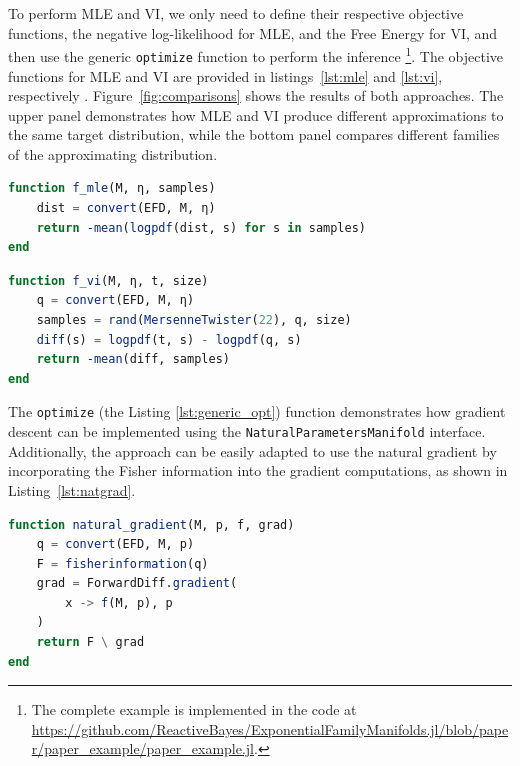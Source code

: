 \documentclass{juliacon}
\begin{document}
To perform MLE and VI, we only need to define their respective objective functions, the negative log-likelihood for MLE, and the Free Energy for VI, and then use the generic \texttt{optimize} function to perform the inference \footnote{The complete example is implemented in the code at \url{https://github.com/ReactiveBayes/ExponentialFamilyManifolds.jl/blob/paper/paper_example/paper_example.jl}.}. The objective functions for MLE and VI are provided in listings~\ref{lst:mle} and \ref{lst:vi}, respectively . Figure~\ref{fig:comparisons} shows the results of both approaches. The upper panel demonstrates how MLE and VI produce different approximations to the same target distribution, while the bottom panel compares different families of the approximating distribution.
\vspace{-0.5em}
\begin{lstlisting}[language=Julia, caption={Objective functions for MLE}, label={lst:mle}]
function f_mle(M, η, samples)
    dist = convert(EFD, M, η)
    return -mean(logpdf(dist, s) for s in samples)
end
\end{lstlisting}
\vspace{-0.5em}
\begin{lstlisting}[language=Julia, caption={Objective functions for VI}, label={lst:vi}]
function f_vi(M, η, t, size)
    q = convert(EFD, M, η)
    samples = rand(MersenneTwister(22), q, size)
    diff(s) = logpdf(t, s) - logpdf(q, s)
    return -mean(diff, samples)
end
\end{lstlisting}
\vspace{1em}
The \texttt{optimize} (the Listing \ref{lst:generic_opt}) function demonstrates how gradient descent can be implemented using the \texttt{NaturalParametersManifold} interface. Additionally, the approach can be easily adapted to use the natural gradient \cite{amari_natural_1998} by incorporating the Fisher information into the gradient computations, as shown in Listing~\ref{lst:natgrad}.

\begin{lstlisting}[language=Julia, label={lst:natgrad}, caption={Computing the natural gradient with \texttt{ForwardDiff.jl} \cite{revels_forward-mode_2016}}]
function natural_gradient(M, p, f, grad)
    q = convert(EFD, M, p)
    F = fisherinformation(q)
    grad = ForwardDiff.gradient(
        x -> f(M, p), p
    )
    return F \ grad
end
\end{lstlisting}

\end{document}
